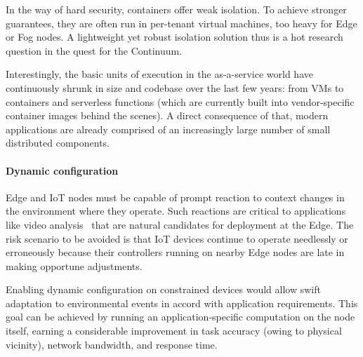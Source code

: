 In the way of hard security, containers offer weak isolation. To achieve stronger guarantees, they are often run in per-tenant virtual machines, too heavy for Edge or Fog nodes. 
A light\-weight yet robust isolation solution thus is a hot research question in the quest for the Continuum.


Interestingly, the basic units of execution in the as-a-service world have continuously shrunk in size and codebase over the last few years: from VMs to containers and serverless functions (which are currently built into vendor-specific container images behind the scenes).
A direct consequence of that, modern applications are already comprised of an increasingly large number of small distributed components.

\paragraph{Dynamic configuration}

Edge and IoT nodes must be capable of prompt reaction to context changes in the environment where they operate. 
Such reactions are critical to applications like video analysis~\cite{jang2018application} that are natural candidates for deployment at the Edge. 
The risk scenario to be avoided is that IoT devices continue to operate needlessly or erroneously because their controllers running on nearby Edge nodes are late in making opportune adjustments.

Enabling dynamic configuration on constrained devices would allow swift adaptation to environmental events in accord with application requirements. 
This goal can be achieved by running an application-specific computation on the node itself, earning a considerable improvement in task accuracy (owing to physical vicinity), network bandwidth, and response time.

